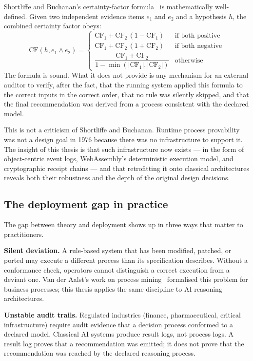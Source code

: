 Shortliffe and Buchanan's certainty-factor formula~\cite{shortliffe1975mycin} is
mathematically well-defined.
Given two independent evidence items $e_1$ and $e_2$ and a hypothesis $h$, the combined
certainty factor obeys:
\[
  \mathrm{CF}(h, e_1 \wedge e_2) =
  \begin{cases}
    \mathrm{CF}_1 + \mathrm{CF}_2\,(1 - \mathrm{CF}_1) & \text{if both positive} \\
    \mathrm{CF}_1 + \mathrm{CF}_2\,(1 + \mathrm{CF}_2) & \text{if both negative} \\
    \dfrac{\mathrm{CF}_1 + \mathrm{CF}_2}{1 - \min(|\mathrm{CF}_1|, |\mathrm{CF}_2|)} & \text{otherwise}
  \end{cases}
\]
The formula is sound.
What it does not provide is any mechanism for an external auditor to verify, after the
fact, that the running system applied this formula to the correct inputs in the correct
order, that no rule was silently skipped, and that the final recommendation was derived
from a process consistent with the declared model.

This is not a criticism of Shortliffe and Buchanan.
Runtime process provability was not a design goal in 1976 because there was no
infrastructure to support it.
The insight of this thesis is that such infrastructure now exists --- in the form of
object-centric event logs, WebAssembly's deterministic execution model, and
cryptographic receipt chains --- and that retrofitting it onto classical architectures
reveals both their robustness and the depth of the original design decisions.

\subsection{The deployment gap in practice}

The gap between theory and deployment shows up in three ways that matter to practitioners.

\textbf{Silent deviation.}
A rule-based system that has been modified, patched, or ported may execute a different
process than its specification describes.
Without a conformance check, operators cannot distinguish a correct execution from a
deviant one.
Van der Aalst's work on process mining~\cite{vanderaalst2016process} formalised this
problem for business processes; this thesis applies the same discipline to AI reasoning
architectures.

\textbf{Unstable audit trails.}
Regulated industries (finance, pharmaceutical, critical infrastructure) require audit
evidence that a decision process conformed to a declared model.
Classical AI systems produce result logs, not process logs.
A result log proves that a recommendation was emitted; it does not prove that the
recommendation was reached by the declared reasoning process.

